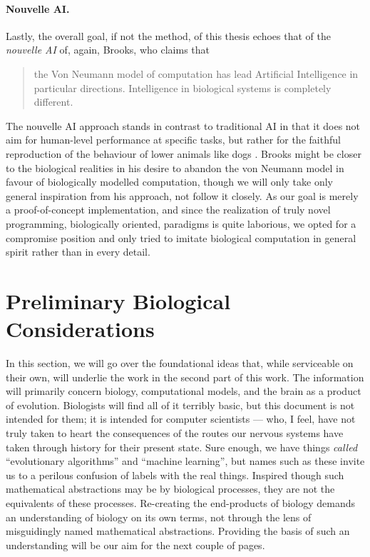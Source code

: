 \paragraph{Nouvelle AI.} Lastly, the overall goal, if not the method, of this thesis echoes that of the {\em nouvelle AI} of, again, Brooks, who claims that
\begin{quotation}
	the Von Neumann model of computation has lead Artificial Intelligence in particular directions. Intelligence in biological systems is completely different. \cite{Brooks91intelligencewithout}
\end{quotation}
The nouvelle AI approach stands in contrast to traditional AI in that it does not aim for human-level performance at specific tasks, but rather for the faithful reproduction of the behaviour of lower animals like dogs \cite{nouvelleAI}. Brooks might be closer to the biological realities in his desire to abandon the von Neumann model in favour of biologically modelled computation, though we will only take only general inspiration from his approach, not follow it closely. As our goal is merely a proof-of-concept implementation, and since the realization of truly novel programming, biologically oriented, paradigms is quite laborious, we opted for a compromise position and only tried to imitate biological computation in general spirit rather than in every detail.

\section{Preliminary Biological Considerations}\label{sec:preliminaryConsiderations}

In this section, we will go over the foundational ideas that, while serviceable on their own, will underlie the work in the second part of this work. The information will primarily concern biology, computational models, and the brain as a product of evolution. Biologists will find all of it terribly basic, but this document is not intended for them; it is intended for computer scientists --- who, I feel, have not truly taken to heart the consequences of the routes our nervous systems have taken through history for their present state. Sure enough, we have things {\em called} ``evolutionary algorithms'' and ``machine learning'', but names such as these invite us to a perilous confusion of labels with the real things. Inspired though such mathematical abstractions may be by biological processes, they are not the equivalents of these processes. Re-creating the end-products of biology demands an understanding of biology on its own terms, not through the lens of misguidingly named mathematical abstractions. Providing the basis of such an understanding will be our aim for the next couple of pages.

